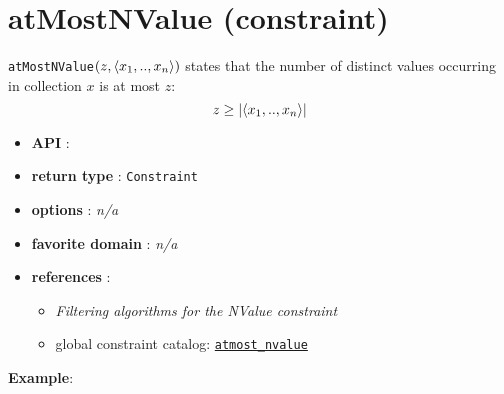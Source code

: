 \label{atmostnvalue}
\hypertarget{atmostnvalue}{}

\section{atMostNValue (constraint)}\label{atmostnvalue:atmostnvalueconstraint}\hypertarget{atmostnvalue:atmostnvalueconstraint}{}
\begin{notedef}
\texttt{atMostNValue}$(z, \langle x_1,..,x_n\rangle)$ states that the number of distinct values occurring in collection $x$ is at most $z$:
$$z\ge|\langle x_1,..,x_n\rangle|$$  
\end{notedef}

\begin{itemize}
	\item \textbf{API} : 
	\item \textbf{return type} : \texttt{Constraint}
	\item \textbf{options} : \emph{n/a}
	\item \textbf{favorite domain} : \emph{n/a}
	\item \textbf{references} :
      \begin{itemize}
      \item  \cite{BessiereCPAIOR05} \emph{Filtering algorithms for the NValue constraint}
      \item global constraint catalog: \href{http://www.emn.fr/x-info/sdemasse/gccat/Catmost_nvalue.html}{\tt atmost\_nvalue}
      \end{itemize}
    \end{itemize}

\textbf{Example}:

